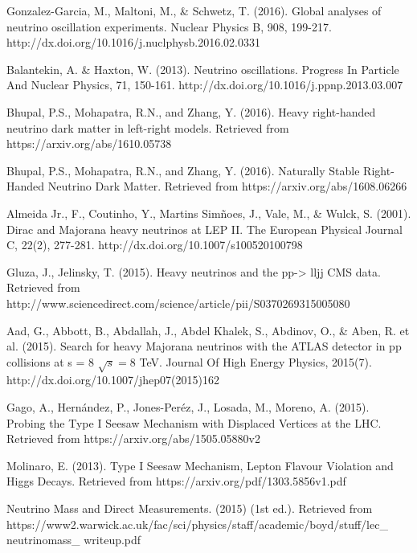 \documentclass[11pt]{book}
\begin{document}
\begin{thebibliography}{10}

 Gonzalez-Garcia, M., Maltoni, M., \& Schwetz, T. (2016). Global analyses of neutrino oscillation experiments. Nuclear Physics B, 908, 199-217. http://dx.doi.org/10.1016/j.nuclphysb.2016.02.0331

 Balantekin, A. \& Haxton, W. (2013). Neutrino oscillations. Progress In Particle And Nuclear Physics, 71, 150-161. http://dx.doi.org/10.1016/j.ppnp.2013.03.007   
 
 Bhupal, P.S., Mohapatra, R.N., and Zhang, Y. (2016). Heavy right-handed neutrino dark matter in left-right models. Retrieved from https://arxiv.org/abs/1610.05738     

 Bhupal, P.S., Mohapatra, R.N., and Zhang, Y. (2016). Naturally Stable Right-Handed Neutrino Dark Matter. Retrieved from https://arxiv.org/abs/1608.06266

 Almeida Jr., F., Coutinho, Y., Martins Simñoes, J., Vale, M., \& Wulck, S. (2001). Dirac and Majorana heavy neutrinos at LEP II. The European Physical Journal C, 22(2), 277-281. http://dx.doi.org/10.1007/s100520100798  

  Gluza, J., Jelinsky, T. (2015). Heavy neutrinos and the pp-> lljj CMS data. Retrieved from http://www.sciencedirect.com/science/article/pii/S0370269315005080 

 Aad, G., Abbott, B., Abdallah, J., Abdel Khalek, S., Abdinov, O., \& Aben, R. et al. (2015). Search for heavy Majorana neutrinos with the ATLAS detector in pp collisions at s = 8 $ \sqrt{s}=8 $ TeV. Journal Of High Energy Physics, 2015(7). http://dx.doi.org/10.1007/jhep07(2015)162  

 Gago, A., Hernández, P., Jones-Peréz, J., Losada, M., Moreno, A. (2015). Probing the Type I Seesaw Mechanism with Displaced Vertices at the LHC. Retrieved from  https://arxiv.org/abs/1505.05880v2

 Molinaro, E. (2013). Type I Seesaw Mechanism, Lepton Flavour    	Violation and                                                                                                       Higgs Decays. Retrieved from https://arxiv.org/pdf/1303.5856v1.pdf

 Neutrino Mass and Direct Measurements. (2015) (1st ed.). Retrieved from https://www2.warwick.ac.uk/fac/sci/physics/staff/academic/boyd/stuff/lec\_ neutrinomass\_ writeup.pdf


\end{thebibliography}
\end{document}
